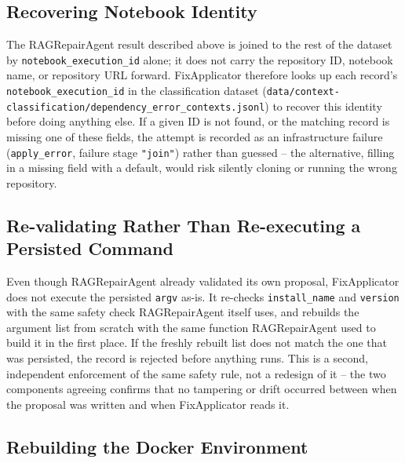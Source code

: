 \subsection{Recovering Notebook Identity}

The RAGRepairAgent result described above is joined to the rest of the
dataset by \texttt{notebook\_execution\_id} alone; it does not carry the
repository ID, notebook name, or repository URL forward. FixApplicator
therefore looks up each record's \texttt{notebook\_execution\_id} in the
classification dataset
(\texttt{data/context-classification/\allowbreak dependency\_error\_contexts.jsonl}) to
recover this identity before doing anything else. If a given ID is not
found, or the matching record is missing one of these fields, the attempt is
recorded as an infrastructure failure (\texttt{apply\_error}, failure stage
\texttt{"join"}) rather than guessed -- the alternative, filling in a
missing field with a default, would risk silently cloning or running the
wrong repository.

\subsection{Re-validating Rather Than Re-executing a Persisted Command}

Even though RAGRepairAgent already validated its own proposal, FixApplicator
does not execute the persisted \texttt{argv} as-is. It re-checks
\texttt{install\_name} and \texttt{version} with the same safety check
RAGRepairAgent itself uses, and rebuilds the argument list from scratch with
the same function RAGRepairAgent used to build it in the first place. If the
freshly rebuilt list does not match the one that was persisted, the record
is rejected before anything runs. This is a second, independent enforcement
of the same safety rule, not a redesign of it -- the two components
agreeing confirms that no tampering or drift occurred between when the
proposal was written and when FixApplicator reads it.

\subsection{Rebuilding the Docker Environment}
\label{sec:m-fixapply-docker}

